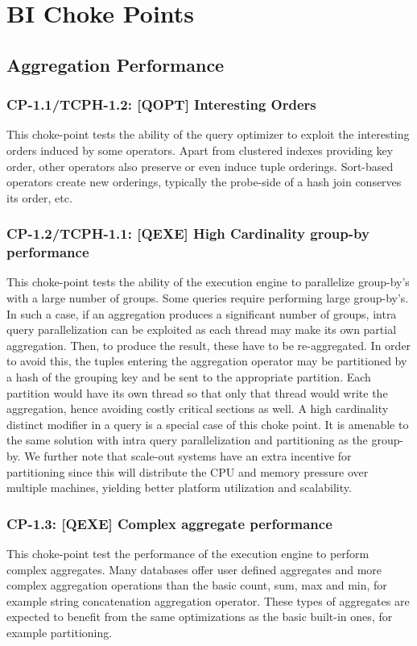 \section{BI Choke Points}

\subsection{Aggregation Performance}

\subsubsection{CP-1.1/TCPH-1.2: [QOPT]  Interesting Orders}
\label{choke_point_1.1}
This choke-point tests the ability of the query optimizer to exploit the interesting orders induced by some operators. Apart from clustered indexes providing key order, other operators also preserve or even induce tuple orderings.
Sort-based operators create new orderings, typically the probe-side of a hash join conserves its order, etc.

\subsubsection{CP-1.2/TCPH-1.1: [QEXE] High Cardinality group-by performance}
\label{choke_point_1.2}
This choke-point tests the ability of the execution engine to parallelize group-by's with a large number of groups. Some queries require performing large group-by's.
In such a case, if an aggregation produces a significant number of groups, intra query parallelization can be exploited as each thread may make its own partial aggregation.
Then, to produce the result, these have to be re-aggregated. In order to avoid this, the tuples entering the aggregation operator may be partitioned by a hash of the grouping key and be sent to the appropriate partition.
Each partition would have its own thread so that only that thread would write the aggregation, hence avoiding costly critical sections as well. A high cardinality distinct modifier in a query is a special case of this choke point.
It is amenable to the same solution with intra query parallelization and partitioning as the group-by.
We further note that scale-out systems have an extra incentive for partitioning since this will distribute the CPU and memory pressure over multiple machines, yielding better platform utilization and scalability.

\subsubsection{CP-1.3: [QEXE] Complex aggregate performance}
\label{choke_point_1.3}
This choke-point test the performance of the execution engine to perform complex aggregates. Many databases offer user defined aggregates and more complex aggregation operations than the basic count, sum, max and min, for example string concatenation aggregation operator. These types of aggregates are expected to benefit from the same optimizations as the basic built-in ones, for example partitioning.

